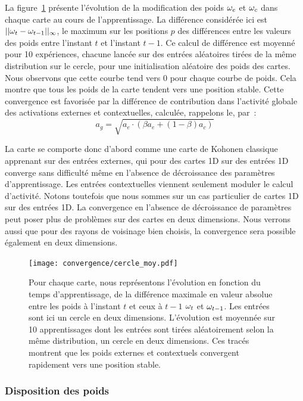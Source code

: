 \documentclass[../main]{subfiles}
\begin{document}
La figure~\ref{fig:conv} présente l'évolution de la modification des poids $\omega_{e}$ et $\omega_{c}$ dans chaque carte au cours de l'apprentissage. La différence considérée ici est $||\omega_t - \omega_{t-1}||_{\infty}$, le maximum sur les positions $p$ des différences entre les valeurs des poids entre l'instant $t$ et l'instant $t-1$. 
Ce calcul de différence est moyenné pour 10 expériences, chacune lancée sur des entrées aléatoires tirées de la même distribution sur le cercle, pour une initialisation aléatoire des poids des cartes.
Nous observons que cette courbe tend vers $0$ pour chaque courbe de poids. Cela montre que tous les poids de la carte tendent vers une position stable.
Cette convergence est favorisée par la différence de contribution dans l'activité globale des activations externes et contextuelles, calculée, rappelons le, par~: 
$$ a_g = \sqrt{a_e \cdot (\beta a_e + (1-\beta)a_c)}$$

La carte se comporte donc d'abord comme une carte de Kohonen classique apprenant sur des entrées externes, qui pour des cartes 1D sur des entrées 1D converge sans difficulté même en l'absence de décroissance des paramètres d'apprentissage. 
Les entrées contextuelles viennent seulement moduler le calcul d'activité.
Notons toutefois que nous sommes sur un cas particulier de cartes 1D sur des entrées 1D.
La convergence en l'absence de décroissance de paramètres peut poser plus de problèmes sur des cartes en deux dimensions. 
Nous verrons aussi que pour des rayons de voisinage bien choisis, la convergence sera possible également en deux dimensions.

\begin{figure}
	\texttt{[image: convergence/cercle\_moy.pdf]}
	\caption{Pour chaque carte, nous représentons l'évolution en fonction du temps d'apprentissage, de la différence maximale en valeur absolue entre les poids à l'instant $t$ et ceux à $t-1$ $\omega_t$ et $\omega_{t-1}$. Les entrées sont ici un cercle en deux dimensions. L'évolution est moyennée sur 10 apprentissages dont les entrées sont tirées aléatoirement selon la même distribution, un cercle en deux dimensions.
	Ces tracés montrent que les poids externes et contextuels convergent rapidement vers une position stable.\label{fig:conv}}
\end{figure}


\subsubsection{Disposition des poids}
\end{document}
